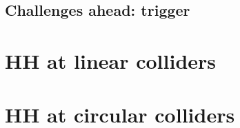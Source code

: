 \documentclass{book}
\begin{document}
\subsection{Challenges ahead: trigger}
\section{HH at linear colliders}
\section{HH at circular colliders}

%





%
%
%
%




%
%
\end{document}
